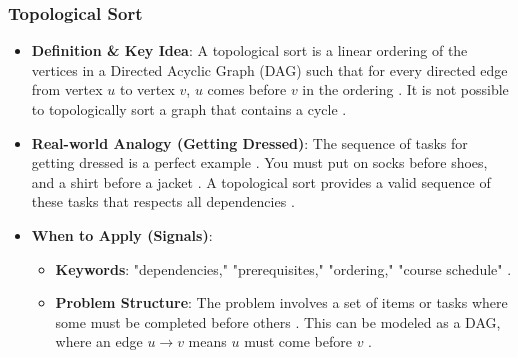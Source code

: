 \documentclass{article}
\begin{document}
\subsubsection{Topological Sort}
\begin{itemize}
\item \textbf{Definition \& Key Idea}: A topological sort is a linear ordering of the vertices in a Directed Acyclic Graph (DAG) such that for every directed edge from vertex $u$ to vertex $v$, $u$ comes before $v$ in the ordering \cite{629}. It is not possible to topologically sort a graph that contains a cycle \cite{630}.
\item \textbf{Real-world Analogy (Getting Dressed)}: The sequence of tasks for getting dressed is a perfect example \cite{632}. You must put on socks before shoes, and a shirt before a jacket \cite{633}. A topological sort provides a valid sequence of these tasks that respects all dependencies \cite{634}.
\item \textbf{When to Apply (Signals)}:
\begin{itemize}
\item \textbf{Keywords}: "dependencies," "prerequisites," "ordering," "course schedule" \cite{635}.
\item \textbf{Problem Structure}: The problem involves a set of items or tasks where some must be completed before others \cite{636}. This can be modeled as a DAG, where an edge $u \rightarrow v$ means $u$ must come before $v$ \cite{640}.
\end{itemize}
\end{itemize}
\end{document}
